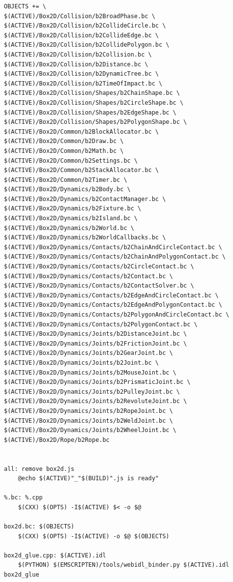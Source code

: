 \begin{enumerate}[itemindent=2em]
\begin{verbatim}
OBJECTS += \
$(ACTIVE)/Box2D/Collision/b2BroadPhase.bc \
$(ACTIVE)/Box2D/Collision/b2CollideCircle.bc \
$(ACTIVE)/Box2D/Collision/b2CollideEdge.bc \
$(ACTIVE)/Box2D/Collision/b2CollidePolygon.bc \
$(ACTIVE)/Box2D/Collision/b2Collision.bc \
$(ACTIVE)/Box2D/Collision/b2Distance.bc \
$(ACTIVE)/Box2D/Collision/b2DynamicTree.bc \
$(ACTIVE)/Box2D/Collision/b2TimeOfImpact.bc \
$(ACTIVE)/Box2D/Collision/Shapes/b2ChainShape.bc \
$(ACTIVE)/Box2D/Collision/Shapes/b2CircleShape.bc \
$(ACTIVE)/Box2D/Collision/Shapes/b2EdgeShape.bc \
$(ACTIVE)/Box2D/Collision/Shapes/b2PolygonShape.bc \
$(ACTIVE)/Box2D/Common/b2BlockAllocator.bc \
$(ACTIVE)/Box2D/Common/b2Draw.bc \
$(ACTIVE)/Box2D/Common/b2Math.bc \
$(ACTIVE)/Box2D/Common/b2Settings.bc \
$(ACTIVE)/Box2D/Common/b2StackAllocator.bc \
$(ACTIVE)/Box2D/Common/b2Timer.bc \
$(ACTIVE)/Box2D/Dynamics/b2Body.bc \
$(ACTIVE)/Box2D/Dynamics/b2ContactManager.bc \
$(ACTIVE)/Box2D/Dynamics/b2Fixture.bc \
$(ACTIVE)/Box2D/Dynamics/b2Island.bc \
$(ACTIVE)/Box2D/Dynamics/b2World.bc \
$(ACTIVE)/Box2D/Dynamics/b2WorldCallbacks.bc \
$(ACTIVE)/Box2D/Dynamics/Contacts/b2ChainAndCircleContact.bc \
$(ACTIVE)/Box2D/Dynamics/Contacts/b2ChainAndPolygonContact.bc \
$(ACTIVE)/Box2D/Dynamics/Contacts/b2CircleContact.bc \
$(ACTIVE)/Box2D/Dynamics/Contacts/b2Contact.bc \
$(ACTIVE)/Box2D/Dynamics/Contacts/b2ContactSolver.bc \
$(ACTIVE)/Box2D/Dynamics/Contacts/b2EdgeAndCircleContact.bc \
$(ACTIVE)/Box2D/Dynamics/Contacts/b2EdgeAndPolygonContact.bc \
$(ACTIVE)/Box2D/Dynamics/Contacts/b2PolygonAndCircleContact.bc \
$(ACTIVE)/Box2D/Dynamics/Contacts/b2PolygonContact.bc \
$(ACTIVE)/Box2D/Dynamics/Joints/b2DistanceJoint.bc \
$(ACTIVE)/Box2D/Dynamics/Joints/b2FrictionJoint.bc \
$(ACTIVE)/Box2D/Dynamics/Joints/b2GearJoint.bc \
$(ACTIVE)/Box2D/Dynamics/Joints/b2Joint.bc \
$(ACTIVE)/Box2D/Dynamics/Joints/b2MouseJoint.bc \
$(ACTIVE)/Box2D/Dynamics/Joints/b2PrismaticJoint.bc \
$(ACTIVE)/Box2D/Dynamics/Joints/b2PulleyJoint.bc \
$(ACTIVE)/Box2D/Dynamics/Joints/b2RevoluteJoint.bc \
$(ACTIVE)/Box2D/Dynamics/Joints/b2RopeJoint.bc \
$(ACTIVE)/Box2D/Dynamics/Joints/b2WeldJoint.bc \
$(ACTIVE)/Box2D/Dynamics/Joints/b2WheelJoint.bc \
$(ACTIVE)/Box2D/Rope/b2Rope.bc


all: remove box2d.js
	@echo $(ACTIVE)"_"$(BUILD)".js is ready"

%.bc: %.cpp
	$(CXX) $(OPTS) -I$(ACTIVE) $< -o $@

box2d.bc: $(OBJECTS)
	$(CXX) $(OPTS) -I$(ACTIVE) -o $@ $(OBJECTS)

box2d_glue.cpp: $(ACTIVE).idl
	$(PYTHON) $(EMSCRIPTEN)/tools/webidl_binder.py $(ACTIVE).idl box2d_glue


\end{verbatim}
\end{enumerate}
